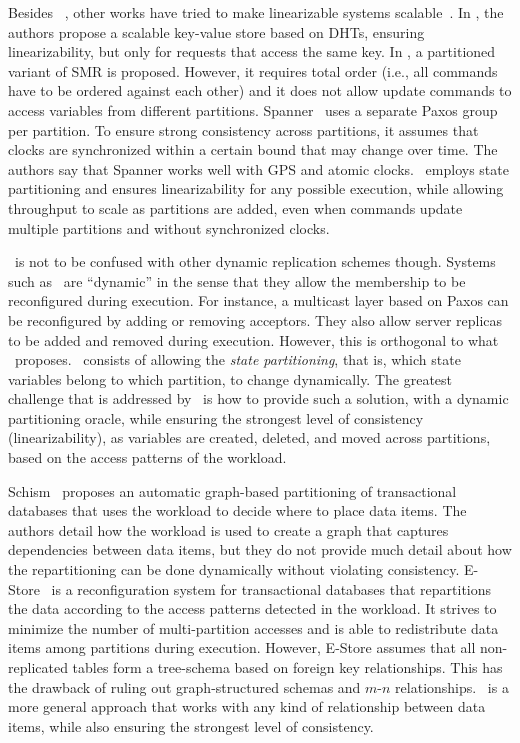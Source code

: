 Besides \ssmr{}~\cite{bezerra2014ssmr}, other works have tried to make linearizable systems scalable~\cite{corbett2013spanner, Glendenning2011, Marandi11}.
In \cite{Glendenning2011}, the authors propose a scalable key-value store based on DHTs, ensuring linearizability, but only for requests that access the same key. 
In \cite{Marandi11}, a partitioned variant of SMR is proposed.
However, it requires total order (i.e., all commands have to be ordered against each other) and it does not allow update commands to access variables from different partitions.
Spanner~\cite{corbett2013spanner} uses a separate Paxos group per partition.
To ensure strong consistency across partitions, it assumes that clocks are synchronized within a certain bound that may change over time.
The authors say that Spanner works well with GPS and atomic clocks.
\dssmrlong\ employs state partitioning and ensures linearizability for any possible execution, while allowing throughput to scale as partitions are added, even when commands update multiple partitions and without synchronized clocks.


\dssmr\ is not to be confused with other dynamic replication schemes though. Systems such as~\cite{birman2010dsr,guessoum2003dar,dustdar2007soc} are ``dynamic'' in the sense that they allow the membership to be reconfigured during execution. For instance, a multicast layer based on Paxos can be reconfigured by adding or removing acceptors. They also allow server replicas to be added and removed during execution.
However, this is orthogonal to what \dssmr\ proposes.
\dssmrlong\ consists of allowing the \emph{state partitioning}, that is, which state variables belong to which partition, to change dynamically.
The greatest challenge that is addressed by \dssmr\ is how to provide such a solution, with a dynamic partitioning oracle, while ensuring the strongest level of consistency (linearizability), as variables are created, deleted, and moved across partitions, based on the access patterns of the workload.


Schism~\cite{curino2010sch} proposes an automatic graph-based partitioning of transactional databases that uses the workload to decide where to place data items.
The authors detail how the workload is used to create a graph that captures dependencies between data items, but they do not provide much detail about how the repartitioning can be done dynamically without violating consistency.
E-Store~\cite{taft2014est} is a reconfiguration system for transactional databases that repartitions the data according to the access patterns detected in the workload.
It strives to minimize the number of multi-partition accesses and is able to redistribute data items among partitions during execution.
However, E-Store assumes that all non-replicated tables form a tree-schema based on foreign key relationships.
This has the drawback of ruling out graph-structured schemas and \mbox{$m$-$n$} relationships.
\dssmr\ is a more general approach that works with any kind of relationship between data items, while also ensuring the strongest level of consistency.



